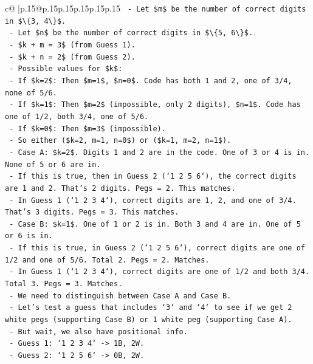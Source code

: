 \documentclass{article}
\begin{document}
{\begin{supertabular}{c@{$\;$}|p{.15\linewidth}@{}p{.15\linewidth}p{.15\linewidth}p{.15\linewidth}p{.15\linewidth}p{.15\linewidth}}
{{{\texttt{    {-} Let \$m\$ be the number of correct digits in \$\textbackslash{}\{3, 4\textbackslash{}\}\$.} \\
\texttt{    {-} Let \$n\$ be the number of correct digits in \$\textbackslash{}\{5, 6\textbackslash{}\}\$.} \\
\texttt{    {-} \$k + m = 3\$ (from Guess 1).} \\
\texttt{    {-} \$k + n = 2\$ (from Guess 2).} \\
\texttt{    {-} Possible values for \$k\$:} \\
\texttt{        {-} If \$k=2\$: Then \$m=1\$, \$n=0\$. Code has both 1 and 2, one of 3/4, none of 5/6.} \\
\texttt{        {-} If \$k=1\$: Then \$m=2\$ (impossible, only 2 digits), \$n=1\$. Code has one of 1/2, both 3/4, one of 5/6.} \\
\texttt{        {-} If \$k=0\$: Then \$m=3\$ (impossible).} \\
\texttt{    {-} So either (\$k=2, m=1, n=0\$) or (\$k=1, m=2, n=1\$).} \\
\texttt{    {-} Case A: \$k=2\$. Digits 1 and 2 are in the code. One of 3 or 4 is in. None of 5 or 6 are in.} \\
\texttt{        {-} If this is true, then in Guess 2 (`1 2 5 6`), the correct digits are 1 and 2. That's 2 digits. Pegs = 2. This matches.} \\
\texttt{        {-} In Guess 1 (`1 2 3 4`), correct digits are 1, 2, and one of 3/4. That's 3 digits. Pegs = 3. This matches.} \\
\texttt{    {-} Case B: \$k=1\$. One of 1 or 2 is in. Both 3 and 4 are in. One of 5 or 6 is in.} \\
\texttt{        {-} If this is true, in Guess 2 (`1 2 5 6`), correct digits are one of 1/2 and one of 5/6. Total 2. Pegs = 2. Matches.} \\
\texttt{        {-} In Guess 1 (`1 2 3 4`), correct digits are one of 1/2 and both 3/4. Total 3. Pegs = 3. Matches.} \\
\texttt{    {-} We need to distinguish between Case A and Case B.} \\
\texttt{    {-} Let's test a guess that includes `3` and `4` to see if we get 2 white pegs (supporting Case B) or 1 white peg (supporting Case A).} \\
\texttt{    {-} But wait, we also have positional info.} \\
\texttt{    {-} Guess 1: `1 2 3 4` {-}> 1B, 2W.} \\
\texttt{    {-} Guess 2: `1 2 5 6` {-}> 0B, 2W.} \\
}}}
\end{supertabular}}
\end{document}
